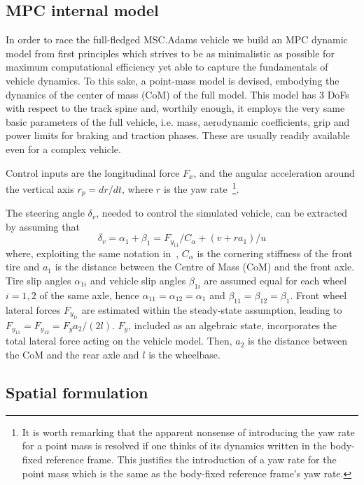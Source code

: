 \documentclass[conference]{IEEEtran} %
\begin{document}
\subsection{MPC internal model}

In order to race the full-fledged MSC.Adams vehicle we build an MPC dynamic model from first principles which strives to be as minimalistic as possible for maximum computational efficiency yet able to capture the fundamentals of vehicle dynamics. To this sake, a point-mass model is devised, embodying the dynamics of the center of mass (CoM) of the full model.
This model has 3 DoFs with respect to the track spine and, worthily enough, it employs the very same basic parameters of the full vehicle, i.e. mass, aerodynamic coefficients, grip and power limits for braking and traction phases. These are usually readily available even for a complex vehicle.

Control inputs are the longitudinal force $F_{x}$, and the angular acceleration around the vertical axis $r_p = dr/dt$, where $r$ is the yaw rate~\footnote{It is worth remarking that the apparent nonsense of introducing the yaw rate for a point mass is resolved if one thinks of its dynamics written in the body-fixed reference frame. This justifies the introduction of a yaw rate for the point mass which is the same as the body-fixed reference frame's yaw rate.}.

The steering angle $\delta_v$, needed to control the simulated vehicle, can be extracted by assuming that
\begin{equation}
\delta_v = \alpha_{1} + \beta_1 = F_{y_{11}}/C_\alpha + (v + ra_1)/u
\end{equation}
where, exploiting the same notation in~\cite{Guiggiani2018}, $C_\alpha$ is the cornering stiffness of the front tire and $a_1$ is the distance between the Centre of Mass (CoM) and the front axle.
Tire slip angles $\alpha_{1i}$ and vehicle slip angles $\beta_{1i}$ are assumed equal for each wheel $i=1, 2$ of the same axle, hence $\alpha_{11} = \alpha_{12} = \alpha_{1}$ and $\beta_{11} = \beta_{12} = \beta_{1}$.
%
Front wheel lateral forces $F_{y_{1i}}$ are estimated within the steady-state assumption, leading to $F_{y_{11}} = F_{y_{12}} = F_{y}a_2/(2l)$.
$F_{y}$, included as an algebraic state, incorporates the total lateral force acting on the vehicle model. Then, $a_2$ is the distance between the CoM and the rear axle and $l$ is the wheelbase.

\subsection{Spatial formulation}
\end{document}

